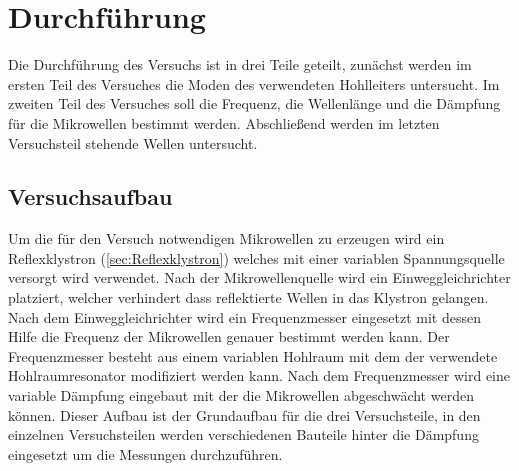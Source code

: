 \newpage
\section{Durchführung}
\label{sec:Durchfuehrung}
    Die Durchführung des Versuchs ist in drei Teile geteilt, zunächst werden im ersten Teil des Versuches die Moden des verwendeten Hohlleiters untersucht. Im zweiten Teil des Versuches soll die Frequenz, die Wellenlänge und die Dämpfung für die Mikrowellen bestimmt werden. Abschließend werden im letzten Versuchsteil stehende Wellen untersucht.
    \subsection{Versuchsaufbau}
        Um die für den Versuch notwendigen Mikrowellen zu erzeugen wird ein Reflexklystron (\ref{sec:Reflexklystron}) welches mit einer variablen Spannungsquelle versorgt wird verwendet.
        Nach der Mikrowellenquelle wird ein Einweggleichrichter platziert, welcher verhindert dass reflektierte Wellen in das Klystron gelangen.
        Nach dem Einweggleichrichter wird ein Frequenzmesser eingesetzt mit dessen Hilfe die Frequenz der Mikrowellen genauer bestimmt werden kann.
        Der Frequenzmesser besteht aus einem variablen Hohlraum mit dem der verwendete Hohlraumresonator modifiziert werden kann.
        Nach dem Frequenzmesser wird eine variable Dämpfung eingebaut mit der die Mikrowellen abgeschwächt werden können.
        Dieser Aufbau ist der Grundaufbau für die drei Versuchsteile, in den einzelnen Versuchsteilen werden verschiedenen Bauteile hinter die Dämpfung eingesetzt um die Messungen durchzuführen.
